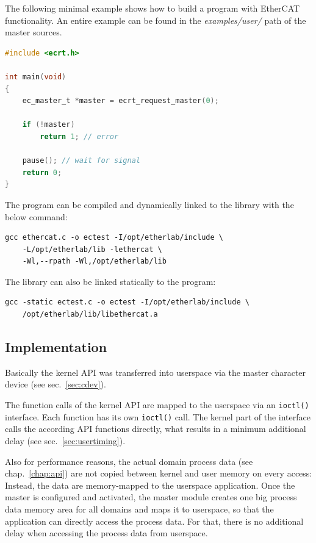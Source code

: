 \documentclass[a4paper,12pt,BCOR6mm,bibtotoc,idxtotoc]{scrbook}
\begin{document}
The following minimal example shows how to build a program with EtherCAT
functionality. An entire example can be found in the \textit{examples/user/}
path of the master sources.

\begin{lstlisting}[language=C]
#include <ecrt.h>

int main(void)
{
    ec_master_t *master = ecrt_request_master(0);

    if (!master)
        return 1; // error

    pause(); // wait for signal
    return 0;
}
\end{lstlisting}

The program can be compiled and dynamically linked to the library with the
below command:

\begin{lstlisting}
gcc ethercat.c -o ectest -I/opt/etherlab/include \
    -L/opt/etherlab/lib -lethercat \
    -Wl,--rpath -Wl,/opt/etherlab/lib
\end{lstlisting}

The library can also be linked statically to the program:

\begin{lstlisting}
gcc -static ectest.c -o ectest -I/opt/etherlab/include \
    /opt/etherlab/lib/libethercat.a
\end{lstlisting}

\subsection{Implementation}
\label{sec:userimp}

Basically the kernel API was transferred into userspace via the master
character device (see sec.~\ref{sec:cdev}).

The function calls of the kernel API are mapped to the userspace via an
\lstinline+ioctl()+ interface. Each function has its own \lstinline+ioctl()+
call. The kernel part of the interface calls the according API functions
directly, what results in a minimum additional delay (see
sec.~\ref{sec:usertiming}).

Also for performance reasons, the actual domain process data (see
chap.~\ref{chap:api}) are not copied between kernel and user memory on every
access: Instead, the data are memory-mapped to the userspace application. Once
the master is configured and activated, the master module creates one big
process data memory area for all domains and maps it to userspace, so that the
application can directly access the process data. For that, there is no
additional delay when accessing the process data from userspace.
\end{document}
